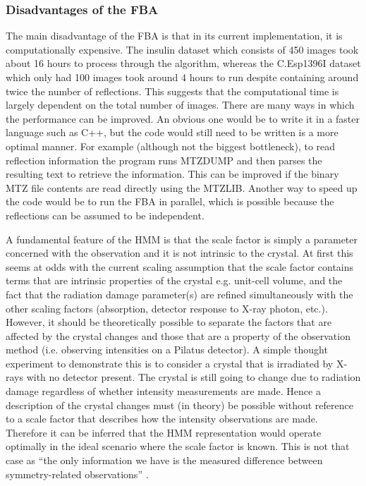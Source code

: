\subsubsection{Disadvantages of the FBA}
\label{subs:Disadvantages of the FBA}
The main disadvantage of the FBA is that in its current implementation, it is computationally expensive.
The insulin dataset which consists of 450 images took about 16 hours to process through the algorithm, whereas the C.Esp1396I dataset which only had 100 images took around 4 hours to run despite containing around twice the number of reflections.
This suggests that the computational time is largely dependent on the total number of images.
There are many ways in which the performance can be improved.
An obvious one would be to write it in a faster language such as C++, but the code would still need to be written is a more optimal manner.
For example (although not the biggest bottleneck), to read reflection information the program runs MTZDUMP and then parses the resulting text to retrieve the information.
This can be improved if the binary MTZ file contents are read directly using the MTZLIB.
Another way to speed up the code would be to run the FBA in parallel, which is possible because the reflections can be assumed to be independent.

A fundamental feature of the HMM is that the scale factor is simply a parameter concerned with the observation and it is not intrinsic to the crystal.
At first this seems at odds with the current scaling assumption that the scale factor contains terms that are intrinsic properties of the crystal e.g. unit-cell volume, and the fact that the radiation damage parameter(s) are refined simultaneously with the other scaling factors (absorption, detector response to X-ray photon, etc.).
However, it should be theoretically possible to separate the factors that are affected by the crystal changes and those that are a property of the observation method (i.e. observing intensities on a Pilatus detector).
A simple thought experiment to demonstrate this is to consider a crystal that is irradiated by X-rays with no detector present.
The crystal is still going to change due to radiation damage regardless of whether intensity measurements are made.
Hence a description of the crystal changes must (in theory) be possible without reference to a scale factor that describes how the intensity observations are made.
Therefore it can be inferred that the HMM representation would operate optimally in the ideal scenario where the scale factor is known.
This is not that case as ``the only information we have is the measured difference between symmetry-related observations'' \cite{evans2005}.

